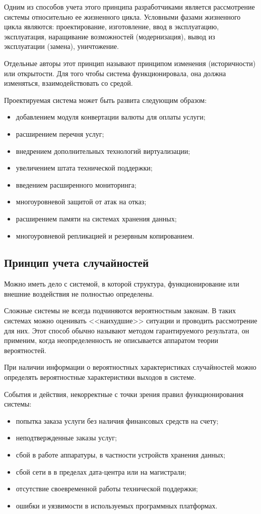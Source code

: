 Одним из способов учета этого принципа разработчиками является рассмотрение системы относительно ее жизненного цикла.
Условными фазами жизненного цикла являются: проектирование, изготовление, ввод в эксплуатацию, эксплуатация, наращивание возможностей (модернизация), вывод из эксплуатации (замена), уничтожение.

Отдельные авторы этот принцип называют принципом изменения (историчности) или открытости.
Для того чтобы система функционировала, она должна изменяться, взаимодействовать со средой.

Проектируемая система может быть развита следующим образом:
\begin{itemize}
  \item добавлением модуля конвертации валюты для оплаты услуги;
  \item расширением перечня услуг;
  \item внедрением дополнительных технологий виртуализации;
  \item увеличением штата технической поддержки;
  \item введением расширенного мониторинга;
  \item многоуровневой защитой от атак на отказ;
  \item расширением памяти на системах хранения данных;
  \item многоуровневой репликацией и резервным копированием.
\end{itemize}

\subsection{Принцип учета случайностей}

Можно иметь дело с системой, в которой структура, функционирование или внешние воздействия не полностью определены.

Сложные системы не всегда подчиняются вероятностным законам.
В таких системах можно оценивать <<наихудшие>> ситуации и проводить рассмотрение для них.
Этот способ обычно называют методом гарантируемого результата, он применим, когда неопределенность не описывается аппаратом теории вероятностей.

При наличии информации о вероятностных характеристиках случайностей можно определять вероятностные характеристики выходов в системе.

События и действия, некорректные с точки зрения правил функционирования системы:
\begin{itemize}
  \item попытка заказа услуги без наличия финансовых средств на счету;
  \item неподтвержденные заказы услуг;
  \item сбой в работе аппаратуры, в частности устройств хранения данных;
  \item сбой сети в в пределах дата-центра или на магистрали;
  \item отсутствие своевременной работы технической поддержки;
  \item ошибки и уязвимости в используемых программных платформах.
\end{itemize}


